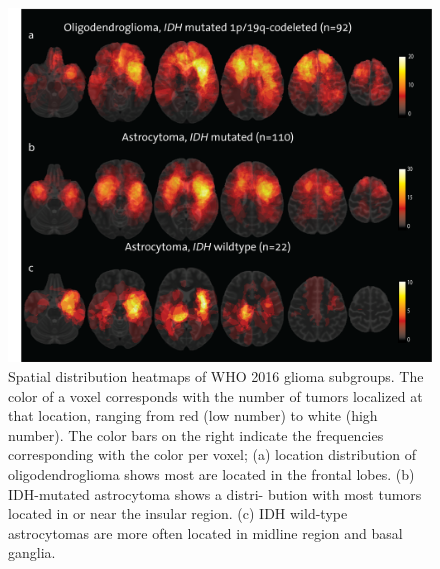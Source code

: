 \begin{figure}
\centering
\includegraphics[width=\textwidth]{Figures/Figure_1.png}
\caption{Spatial distribution heatmaps of WHO 2016 glioma subgroups. The color of a voxel corresponds with the number of tumors localized at that
location, ranging from red (low number) to white (high number). The color bars on the right indicate the frequencies corresponding with the color
per voxel; (a) location distribution of oligodendroglioma shows most are located in the frontal lobes. (b) IDH-mutated astrocytoma shows a distri-
bution with most tumors located in or near the insular region. (c) IDH wild-type astrocytomas are more often located in midline region and basal
ganglia.}
\label{fig:LGG_location_heatmap_subgroups}
\end{figure}



